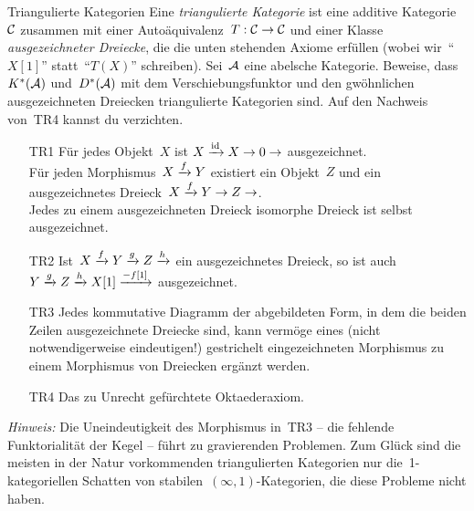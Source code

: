 \documentclass{uebblatt}
\begin{document}
\begin{aufgabe}{Triangulierte Kategorien}
Eine \emph{triangulierte Kategorie} ist eine additive Kategorie~$\mathcal{C}$ zusammen
mit einer Autoäquivalenz~$T : \mathcal{C} \to \mathcal{C}$ und einer Klasse \emph{ausgezeichneter
Dreiecke}, die die unten stehenden Axiome erfüllen (wobei wir~"`$X[1]$"' statt~"`$T(X)$"'
schreiben). Sei~$\mathcal{A}$ eine abelsche Kategorie. Beweise, dass~$K^*(\mathcal{A})$ und~$D^*(\mathcal{A})$
mit dem Verschiebungsfunktor und den gwöhnlichen ausgezeichneten Dreiecken
triangulierte Kategorien sind. Auf den Nachweis von~TR4 kannst du
verzichten.\par
\begin{scriptsize}
\begin{itemize}
\item[TR1] Für jedes Objekt~$X$ ist $X \xrightarrow{\mathrm{id}} X \to 0 \to$
ausgezeichnet.\\[-1.5em]

Für jeden Morphismus~$X \xrightarrow{f} Y$ existiert ein Objekt~$Z$ und ein
ausgezeichnetes Dreieck~$X \xrightarrow{f} Y \to Z \to$.\\[-1.5em]

Jedes zu einem ausgezeichneten Dreieck isomorphe Dreieck ist selbst
ausgezeichnet.

\item[TR2] Ist~$X \xrightarrow{f} Y \xrightarrow{g} Z \xrightarrow{h}$ ein ausgezeichnetes Dreieck, so
ist auch $Y \xrightarrow{g} Z \xrightarrow{h} X[1] \xrightarrow{-f[1]}$ ausgezeichnet.

\item[TR3] Jedes kommutative Diagramm der abgebildeten Form, in dem die beiden Zeilen
ausgezeichnete Dreiecke sind, kann vermöge eines (nicht notwendigerweise
eindeutigen!) gestrichelt eingezeichneten Morphismus zu einem Morphismus von
Dreiecken ergänzt werden.

\item[TR4] Das zu Unrecht gefürchtete Oktaederaxiom.
\end{itemize}
\end{scriptsize}

\begin{minipage}{0.8\textwidth}{\tiny\emph{Hinweis:} Die Uneindeutigkeit des Morphismus in~TR3 -- die fehlende
Funktorialität der Kegel -- führt zu gravierenden Problemen. Zum Glück sind die
meisten in der Natur vorkommenden triangulierten Kategorien nur
die~1-kategoriellen Schatten von stabilen~$(\infty,1)$-Kategorien, die diese
Probleme nicht haben.\par}\end{minipage}
\end{aufgabe}
\end{document}
